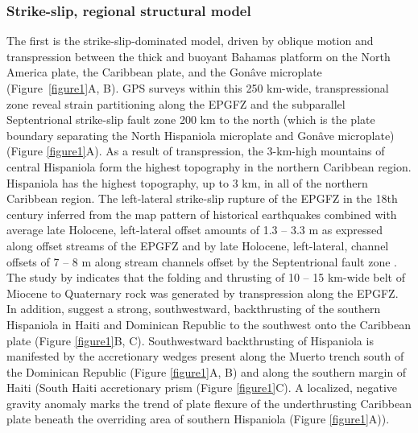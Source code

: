 \documentclass[linenumbers,draft]{agujournal}
\begin{document}
\subsubsection{Strike-slip, regional structural model}
The first is the strike-slip-dominated model, driven by oblique motion and transpression between the thick and buoyant Bahamas platform on the North America plate, the Caribbean plate, and the Gon\^ave microplate \citep{mann1995actively,dolan1998active,mann2002oblique,calais2002strain,calais2016plate} (Figure~\ref{figure1}A, B). GPS surveys within this 250 km-wide, transpressional zone \citep{calais2002strain,calais2010transpressional,hayes2010complex,symithe2013coseismic,douilly2013crustal,douilly2015three} reveal strain partitioning along the EPGFZ and the subparallel Septentrional strike-slip fault zone 200 km to the north (which is the plate boundary separating the North Hispaniola microplate and Gon\^ave microplate) (Figure {\ref{figure1}}A). As a result of transpression, the 3-km-high mountains of central Hispaniola form the highest topography in the northern Caribbean region. Hispaniola has the highest topography, up to 3 km, in all of the northern Caribbean region. The left-lateral strike-slip rupture of the EPGFZ in the 18th century inferred from the map pattern of historical earthquakes \citep{bakun2012significant} combined with average late Holocene, left-lateral offset amounts of 1.3 -- 3.3 m as expressed along offset streams of the EPGFZ \citep{prentice2010seismic} and by late Holocene, left-lateral, channel offsets of 7 -- 8 m along stream channels offset by the Septentrional fault zone \citep{prentice1993paleoseismicity,leroy2015segmentation}. The study by \citet{saint2015seismotectonics} indicates that the folding and thrusting of 10 -- 15 km-wide belt of Miocene to Quaternary rock was generated by transpression along the EPGFZ. In addition, \citet{mann2002oblique,grindlay2005high,kroehler2011late} suggest a strong, southwestward, backthrusting of the southern Hispaniola in Haiti and Dominican Republic to the southwest onto the Caribbean plate (Figure \ref{figure1}B, C). Southwestward backthrusting of Hispaniola is manifested by the accretionary wedges present along the Muerto trench south of the Dominican Republic \citep{bien1986contribution,bruna2009morphotectonics} (Figure \ref{figure1}A, B) and along the southern margin of Haiti (South Haiti accretionary prism \citep{bien1986contribution} (Figure \ref{figure1}C). A localized, negative gravity anomaly marks the trend of plate flexure of the underthrusting Caribbean plate beneath the overriding area of southern Hispaniola \citep{mann2002oblique,bruna2009morphotectonics} (Figure \ref{figure1}A)).
\end{document}
